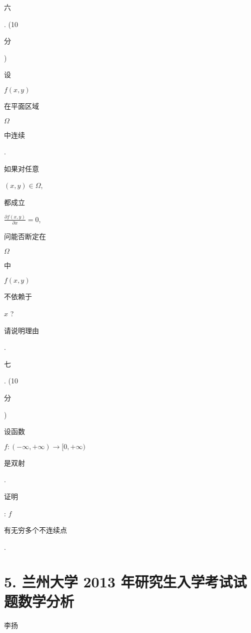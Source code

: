 \documentclass[10pt]{article}
\begin{document}
\begin{CJK}{UTF8}{mj}六\end{CJK}. (10 \begin{CJK}{UTF8}{mj}分\end{CJK}) \begin{CJK}{UTF8}{mj}设\end{CJK} $f(x, y)$ \begin{CJK}{UTF8}{mj}在平面区域\end{CJK} $\Omega$ \begin{CJK}{UTF8}{mj}中连续\end{CJK}. \begin{CJK}{UTF8}{mj}如果对任意\end{CJK} $(x, y) \in \Omega$, \begin{CJK}{UTF8}{mj}都成立\end{CJK} $\frac{\partial f(x, y)}{\partial x}=0$, \begin{CJK}{UTF8}{mj}问能否断定在\end{CJK} $\Omega$ \begin{CJK}{UTF8}{mj}中\end{CJK} $f(x, y)$ \begin{CJK}{UTF8}{mj}不依赖于\end{CJK} $x$ ? \begin{CJK}{UTF8}{mj}请说明理由\end{CJK}.

\begin{CJK}{UTF8}{mj}七\end{CJK}. (10 \begin{CJK}{UTF8}{mj}分\end{CJK}) \begin{CJK}{UTF8}{mj}设函数\end{CJK} $f:(-\infty,+\infty) \rightarrow[0,+\infty)$ \begin{CJK}{UTF8}{mj}是双射\end{CJK}. \begin{CJK}{UTF8}{mj}证明\end{CJK}: $f$ \begin{CJK}{UTF8}{mj}有无穷多个不连续点\end{CJK}.

\section{5. 兰州大学 2013 年研究生入学考试试题数学分析}
\begin{CJK}{UTF8}{mj}李扬\end{CJK}
\end{document}
